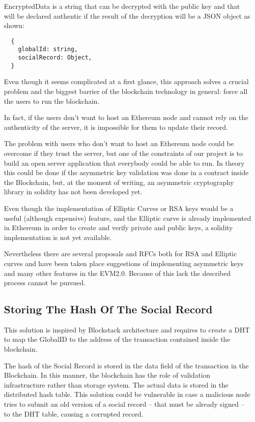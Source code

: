 EncryptedData is a string that can be decrypted with the public key and that will be declared authentic if the result of the decryption will be a JSON object as shown:

\begin{lstlisting}
  {
	globalId: string,
	socialRecord: Object,
  }
\end{lstlisting}

Even though it seems complicated at a first glance, this approach solves a crucial problem and the biggest barrier of the blockchain technology in general: force all the users to run the blockchain.

In fact, if the users don’t want to host an Ethereum node and cannot rely on the authenticity of the server, it is impossible for them to update their record.

The problem with users who don’t want to host an Ethereum node could be overcome if they trust the server, but one of the constraints of our project is to build an open server application that everybody could be able to run. In theory this could be done if the asymmetric key validation was done in a contract inside the Blockchain, but, at the moment of writing, an asymmetric cryptography library in solidity has not been developed yet.

Even though the implementation of Elliptic Curves or RSA keys would be a useful (although expensive) feature, and the Elliptic curve is already implemented in Ethereum in order to create and verify private and public keys, a solidity implementation is not yet available.

Nevertheless there are several proposals and RFCs both for RSA and Elliptic curves \citep{ECImplementation} \citep{RSAImplementation} and have been taken place suggestions of implementing asymmetric keys and many other features in the EVM2.0.
Because of this lack the described process cannot be pursued.

\subsection{Storing The Hash Of The Social Record}
This solution is inspired by Blockstack architecture and requires to create a DHT to map the GlobalID to the address of the transaction contained inside the blockchain.

The hash of the Social Record is stored in the data field of the transaction in the Blockchain. In this manner, the blockchain has the role of validation infrastructure rather than storage system. The actual data is stored in the distributed hash table. This solution could be vulnerable in case a malicious node tries to submit an old version of a social record -- that must be already signed -- to the DHT table, causing a corrupted record.

